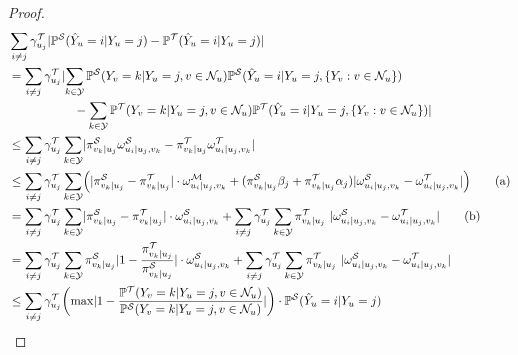 \begin{proof}
\begin{align*}
    &\sum_{i\neq j}\gammat{u_j}
        \abs{\probs(\predy_u=i| \rvY_u=j) - \probt(\predy_u=i| \rvY_u=j)}
    \\
    &=\sum_{i\neq j}\gammat{u_j} 
    \begin{aligned}[t]
        &\abs{ \sum_{k\in\mathcal{Y}}  
        \probs(\rvY_{v}=k | \rvY_u=j, v\in \neighbor_u )
        \probs(\predy_u=i| \rvY_u=j, \set{\rvY_{v}:v\in \neighbor_u}) \\
        &\quad - \sum_{k\in\mathcal{Y}}  
        \probt(\rvY_{v}=k | \rvY_u=j, v\in \neighbor_u )
        \probt(\predy_u=i| \rvY_u=j, \set{\rvY_{v}:v\in \neighbor_u})
        }
    \end{aligned}
    \\
    &\leq\sum_{i\neq j} \gammat{u_j}\sum_{k\in\mathcal{Y}}
        \abs{  \pis{v_k|u_j}
        \omegas{u_i|u_j,v_k} 
        -
        \pit{v_k|u_j} \omegat{u_i|u_j,v_k}
        }
    \\
    &\leq\sum_{i\neq j} \gammat{u_j}\sum_{k\in\mathcal{Y}}\rpar*{
    \abs{\pis{v_k|u_j} -\pit{v_k|u_j} }\cdot \omegam{u_i|u_j,v_k} 
    + 
    (\pis{v_k|u_j}  \beta_j+\pit{v_k|u_j}  \alpha_j)
    \abs{\omegas{u_i|u_j,v_k}
    - 
    \omegat{u_i|u_j,v_k}}}
    \tag{a}
    \\
     &=\sum_{i\neq j} \gammat{u_j} \sum_{k\in\mathcal{Y}}
    \abs{\pis{v_k|u_j} -\pit{v_k|u_j} }\cdot \omegas{u_i|u_j,v_k} 
    + 
    \sum_{i\neq j} \gammat{u_j}\sum_{k\in\mathcal{Y}}
   \pit{v_k|u_j}\
    \abs{\omegas{u_i|u_j,v_k}
    - 
    \omegat{u_i|u_j,v_k}}
    \tag{b}
    \\
     &=\sum_{i\neq j} \gammat{u_j}  \sum_{k\in\mathcal{Y}}
    \pis{v_k|u_j}\abs{1 -\frac{\pit{v_k|u_j}}{\pis{v_k|u_j}} }\cdot \omegas{u_i|u_j,v_k} 
    + 
    \sum_{i\neq j} \gammat{u_j}\sum_{k\in\mathcal{Y}}
   \pit{v_k|u_j}\
    \abs{\omegas{u_i|u_j,v_k}
    - 
    \omegat{u_i|u_j,v_k}}
    \\    
    &\leq \sum_{i\neq j} \gammat{u_j}  \rpar*{\max \abs{1-\frac{\probt(Y_v=k|Y_u=j,v\in \neighbor_u)}{\probs(Y_v=k|Y_u=j,v\in \neighbor_u)}}} \cdot \probs(\predy_u=i| \rvY_u=j) 

\end{align*}
\end{proof}
